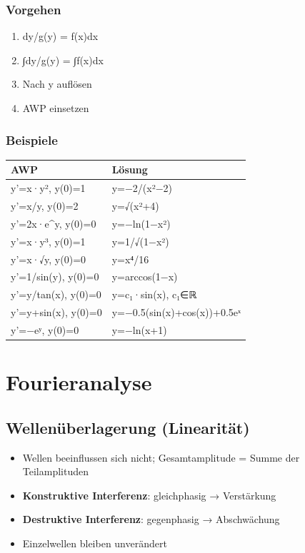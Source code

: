 \documentclass[11pt, a4paper]{article}
\begin{document}
\subsubsection{Vorgehen}
\begin{enumerate}
  \item dy/g(y) = f(x)dx
  \item ∫dy/g(y) = ∫f(x)dx
  \item Nach y auflösen
  \item AWP einsetzen
\end{enumerate}


\subsubsection{Beispiele}

{\small
\begin{tabularx}{\linewidth}{XX}
\hline
\rowcolor{tableheadbg}
{\color{white}\textbf{AWP}} & {\color{white}\textbf{Lösung}} \\[2pt]
\hline
\endhead
\hline
\endfoot
y'=x·y², y(0)=1 & y=−2/(x²−2) \\
y'=x/y, y(0)=2 & y=√(x²+4) \\
y'=2x·e\textasciicircum{}y, y(0)=0 & y=−ln(1−x²) \\
y'=x·y³, y(0)=1 & y=1/√(1−x²) \\
y'=x·√y, y(0)=0 & y=x⁴/16 \\
y'=1/sin(y), y(0)=0 & y=arccos(1−x) \\
y'=y/tan(x), y(0)=0 & y=c₁·sin(x), c₁∈ℝ \\
y'=y+sin(x), y(0)=0 & y=−0.5(sin(x)+cos(x))+0.5eˣ \\
y'=−eʸ, y(0)=0 & y=−ln(x+1) \\
\end{tabularx}
}



\section{Fourieranalyse}


\subsection{Wellenüberlagerung (Linearität)}
\begin{itemize}
  \item Wellen beeinflussen sich nicht; Gesamtamplitude = Summe der Teilamplituden
  \item \textbf{Konstruktive Interferenz}: gleichphasig → Verstärkung
  \item \textbf{Destruktive Interferenz}: gegenphasig → Abschwächung
  \item Einzelwellen bleiben unverändert
\end{itemize}
\end{document}

